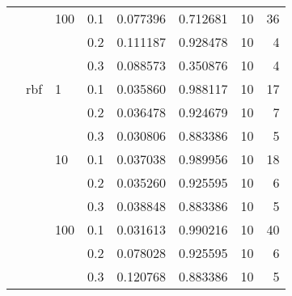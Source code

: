 \begin{table}[H]
\begin{tabular}{llllrrrr}
       &     & 100 & 0.1 &     0.077396 &  0.712681 &        10 &    36 \\
       &     &     & 0.2 &     0.111187 &  0.928478 &        10 &     4 \\
       &     &     & 0.3 &     0.088573 &  0.350876 &        10 &     4 \\
       & rbf & 1   & 0.1 &     0.035860 &  0.988117 &        10 &    17 \\
       &     &     & 0.2 &     0.036478 &  0.924679 &        10 &     7 \\
       &     &     & 0.3 &     0.030806 &  0.883386 &        10 &     5 \\
       &     & 10  & 0.1 &     0.037038 &  0.989956 &        10 &    18 \\
       &     &     & 0.2 &     0.035260 &  0.925595 &        10 &     6 \\
       &     &     & 0.3 &     0.038848 &  0.883386 &        10 &     5 \\
       &     & 100 & 0.1 &     0.031613 &  0.990216 &        10 &    40 \\
       &     &     & 0.2 &     0.078028 &  0.925595 &        10 &     6 \\
       &     &     & 0.3 &     0.120768 &  0.883386 &        10 &     5 \\
\bottomrule
\end{tabular}
\end{table}
